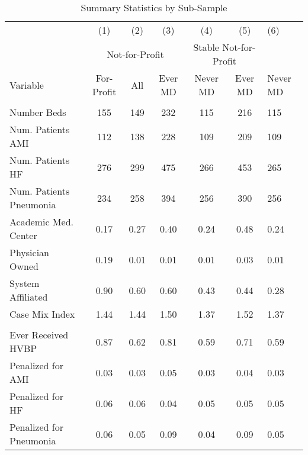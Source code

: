 \begin{table}[ht!]
\centering
\caption{\label{tab:sumstats_samples} Summary Statistics by Sub-Sample}
\centering
\begin{tabular}[t]{lcccccl}
\toprule
 & (1) & (2) & (3) & (4) & (5) & (6)\\
\addlinespace[0.3em]
\multicolumn{2}{c}{ } & \multicolumn{3}{c}{Not-for-Profit} & \multicolumn{2}{c}{Stable Not-for-Profit} \\
\cmidrule(l{3pt}r{3pt}){3-5} \cmidrule(l{3pt}r{3pt}){6-7}
Variable & For-Profit & All & Ever MD & Never MD & Ever MD & Never MD\\
\midrule
\addlinespace[0.3em]
\multicolumn{7}{l}{\textbf{Hospital Characteristics}}\\
\hspace{1em}Number Beds & 155 & 149 & 232 & 115 & 216 & 115\\
\hspace{1em}Num. Patients AMI & 112 & 138 & 228 & 109 & 209 & 109\\
\hspace{1em}Num. Patients HF & 276 & 299 & 475 & 266 & 453 & 265\\
\hspace{1em}Num. Patients Pneumonia & 234 & 258 & 394 & 256 & 390 & 256\\
\hspace{1em}Academic Med. Center & 0.17 & 0.27 & 0.40 & 0.24 & 0.48 & 0.24\\
\hspace{1em}Physician Owned & 0.19 & 0.01 & 0.01 & 0.01 & 0.03 & 0.01\\
\hspace{1em}System Affiliated & 0.90 & 0.60 & 0.60 & 0.43 & 0.44 & 0.28\\
\hspace{1em}Case Mix Index & 1.44 & 1.44 & 1.50 & 1.37 & 1.52 & 1.37\\
\addlinespace[0.3em]
\multicolumn{7}{l}{\textbf{Penalty/Payment Variables}}\\
\hspace{1em}Ever Received HVBP & 0.87 & 0.62 & 0.81 & 0.59 & 0.71 & 0.59\\
\hspace{1em}Penalized for AMI & 0.03 & 0.03 & 0.05 & 0.03 & 0.04 & 0.03\\
\hspace{1em}Penalized for HF & 0.06 & 0.06 & 0.04 & 0.05 & 0.05 & 0.05\\
\hspace{1em}Penalized for Pneumonia & 0.06 & 0.05 & 0.09 & 0.04 & 0.09 & 0.05\\

\end{tabular}
\end{table}
